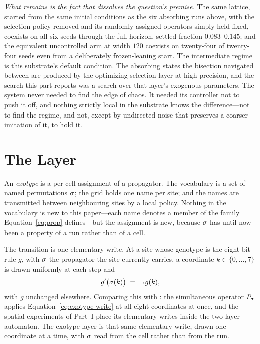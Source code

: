\emph{What remains is the fact that dissolves the question's premise.} The
same lattice, started from the same initial conditions as the six absorbing
runs above, with the selection policy removed and its randomly assigned
operators simply held fixed, coexists on all six seeds through the full
horizon, settled fraction $0.083$--$0.145$; and the equivalent uncontrolled
arm at width $120$ coexists on twenty-four of twenty-four seeds even from a
deliberately frozen-leaning start. The intermediate regime is this substrate's
default condition. The absorbing states the bisection navigated between are
produced by the optimizing selection layer at high precision, and the search
this part reports was a search over that layer's exogenous parameters. The
system never needed to find the edge of chaos. It needed its controller not
to push it off, and nothing strictly local in the substrate knows the
difference---not to find the regime, and not, except by undirected noise that
preserves a coarser imitation of it, to hold it.

\section{The Layer}
\label{sec:exotype-layer}

An \emph{exotype} is a per-cell assignment of a propagator. The vocabulary is a
set of named permutations $\sigma$; the grid holds one name per site; and the
names are transmitted between neighbouring sites by a local policy. Nothing in
the vocabulary is new to this paper---each name denotes a member of the family
Equation~\eqref{eq:prop} defines---but the assignment is new, because $\sigma$ has
until now been a property of a run rather than of a cell.

The transition is one elementary write. At a site whose genotype is the
eight-bit rule $g$, with $\sigma$ the propagator the site currently carries, a
coordinate $k \in \{0,\dots,7\}$ is drawn uniformly at each step and
%
\begin{equation}
  g'\bigl(\sigma(k)\bigr) \;=\; \neg\, g(k),
  \label{eq:exotype-write}
\end{equation}
%
with $g$ unchanged elsewhere. Comparing this with : the
simultaneous operator $P_\sigma$ applies Equation~\eqref{eq:exotype-write} at all
eight coordinates at once, and the spatial experiments of Part~I place its
elementary writes inside the two-layer automaton. The exotype layer is that same
elementary write, drawn one coordinate at a time, with $\sigma$ read from the cell
rather than from the run.

